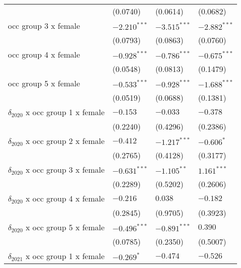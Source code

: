 \begin{tabular}{llll}
                                       &           (0.0740) &           (0.0614) &           (0.0682) \\
occ group 3 x female                   &     $-2.210^{***}$ &     $-3.515^{***}$ &     $-2.882^{***}$ \\
                                       &           (0.0793) &           (0.0863) &           (0.0760) \\
occ group 4 x female                   &     $-0.928^{***}$ &     $-0.786^{***}$ &     $-0.675^{***}$ \\
                                       &           (0.0548) &           (0.0813) &           (0.1479) \\
occ group 5 x female                   &     $-0.533^{***}$ &     $-0.928^{***}$ &     $-1.688^{***}$ \\
                                       &           (0.0519) &           (0.0688) &           (0.1381) \\
$\delta_{2020}$ x occ group 1 x female &           $-0.153$ &           $-0.033$ &           $-0.378$ \\
                                       &           (0.2240) &           (0.4296) &           (0.2386) \\
$\delta_{2020}$ x occ group 2 x female &           $-0.412$ &     $-1.217^{***}$ &         $-0.606^*$ \\
                                       &           (0.2765) &           (0.4128) &           (0.3177) \\
$\delta_{2020}$ x occ group 3 x female &     $-0.631^{***}$ &      $-1.105^{**}$ &      $1.161^{***}$ \\
                                       &           (0.2289) &           (0.5202) &           (0.2606) \\
$\delta_{2020}$ x occ group 4 x female &           $-0.216$ &            $0.038$ &           $-0.182$ \\
                                       &           (0.2845) &           (0.9705) &           (0.3923) \\
$\delta_{2020}$ x occ group 5 x female &     $-0.496^{***}$ &     $-0.891^{***}$ &            $0.390$ \\
                                       &           (0.0785) &           (0.2350) &           (0.5007) \\
$\delta_{2021}$ x occ group 1 x female &         $-0.269^*$ &           $-0.474$ &           $-0.526$ \\

\end{tabular}
